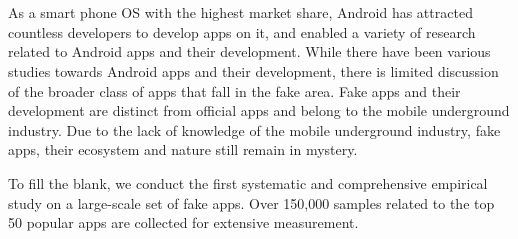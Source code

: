 \newpage

\vspace{-500pt}

\chapter*{}

As a smart phone OS with the highest market share, Android has attracted countless developers to develop apps on it, and enabled a variety of research related to Android apps and their development.
While there have been various studies towards Android apps and their development, there is limited discussion of the broader class of apps that fall in the fake area.
Fake apps and their development are distinct from official apps and belong to the mobile underground industry.
Due to the lack of knowledge of the mobile underground industry, fake apps, their ecosystem and nature still remain in mystery.


To fill the blank, we conduct the first systematic and comprehensive empirical study on a large-scale set of fake apps.
Over 150,000 samples related to the top 50 popular apps are collected for extensive measurement.


